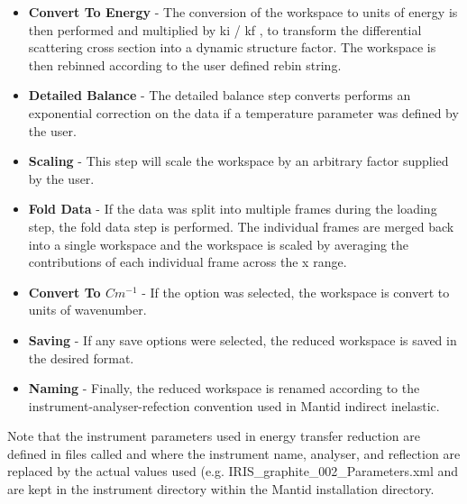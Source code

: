 \documentclass[paper=a4, fontsize=11pt]{scrartcl}	%
\numberwithin{equation}{section}															%
\numberwithin{figure}{section}																%
\numberwithin{table}{section}																%
\begin{document}
\begin{itemize}
\item \textbf{Convert To Energy} - The conversion of the workspace to units of energy is then performed and multiplied by ki / kf , to transform the differential scattering cross section into a dynamic structure factor. The workspace is then rebinned according to the user defined rebin string.

\item \textbf{Detailed Balance} - The detailed balance step converts performs an exponential correction on the data if a temperature parameter was defined by the user.

\item \textbf{Scaling} - This step will scale the workspace by an arbitrary factor supplied by the user.

\item \textbf{Fold Data} - If the data was split into multiple frames during the loading step, the fold data step is performed. The individual frames are merged back into a single workspace and the workspace is scaled by averaging the contributions of each individual frame across the x range.

\item \textbf{Convert To $Cm^{-1}$} - If the option was selected, the workspace is convert to units of wavenumber.

\item \textbf{Saving} - If any save options were selected, the reduced workspace is saved in the desired format.
\item \textbf{Naming} - Finally, the reduced workspace is renamed according to the instrument-analyser-refection convention used in Mantid indirect inelastic.
\end{itemize}

Note that the instrument parameters used in energy transfer reduction are defined in files called  and  where the instrument name, analyser, and reflection are replaced by the actual values used (e.g. IRIS\_graphite\_002\_Parameters.xml and are kept in the instrument directory within the Mantid installation directory.
\end{document}
